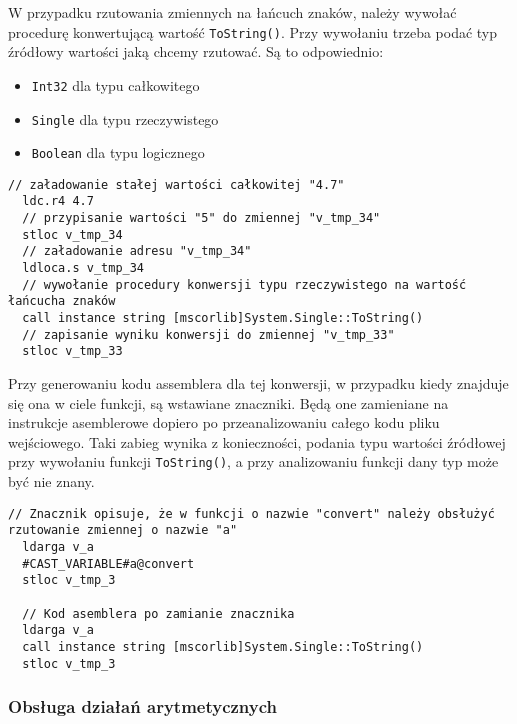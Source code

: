 \par W przypadku rzutowania zmiennych na łańcuch znaków, należy wywołać procedurę konwertującą wartość \texttt{ToString()}. Przy wywołaniu trzeba podać typ źródłowy wartości jaką chcemy rzutować. Są to odpowiednio:
\begin{itemize}
  \item \texttt{Int32} dla typu całkowitego
  \item \texttt{Single} dla typu rzeczywistego
  \item \texttt{Boolean} dla typu logicznego
\end{itemize}

\begin{lstlisting}[language=IL, caption=Kod assemblera rzutowania wrtości rzeczywistej na wartość łańcucha znaków, label=alg:variable4]
  // załadowanie stałej wartości całkowitej "4.7"
  ldc.r4 4.7
  // przypisanie wartości "5" do zmiennej "v_tmp_34"
  stloc v_tmp_34
  // załadowanie adresu "v_tmp_34"
  ldloca.s v_tmp_34
  // wywołanie procedury konwersji typu rzeczywistego na wartość łańcucha znaków
  call instance string [mscorlib]System.Single::ToString()
  // zapisanie wyniku konwersji do zmiennej "v_tmp_33"
  stloc v_tmp_33
\end{lstlisting}

\par Przy generowaniu kodu assemblera dla tej konwersji, w przypadku kiedy znajduje się ona w ciele funkcji, są wstawiane znaczniki. Będą one zamieniane na instrukcje asemblerowe dopiero po przeanalizowaniu całego kodu pliku wejściowego. Taki zabieg wynika z konieczności, podania typu wartości źródłowej przy wywołaniu funkcji \texttt{ToString()}, a przy analizowaniu funkcji dany typ może być nie znany.

\begin{lstlisting}[language=IL, caption={Przykład kodu assemblera rzutowania wrtości w funkcji, przed podmianą znacznika i po podmianie}, label=alg:variable4]
  // Znacznik opisuje, że w funkcji o nazwie "convert" należy obsłużyć rzutowanie zmiennej o nazwie "a"
  ldarga v_a
  #CAST_VARIABLE#a@convert
  stloc v_tmp_3

  // Kod asemblera po zamianie znacznika
  ldarga v_a
  call instance string [mscorlib]System.Single::ToString()
  stloc v_tmp_3
\end{lstlisting}

\subsubsection{Obsługa działań arytmetycznych}

